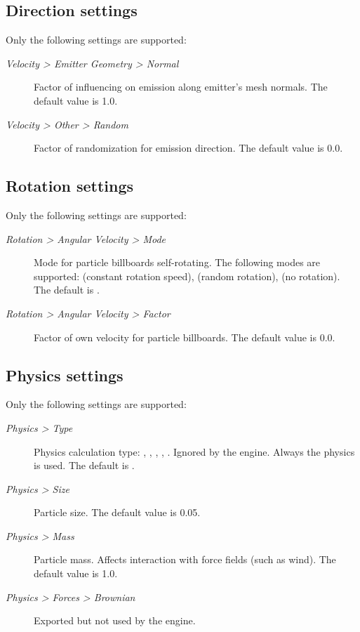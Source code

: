 \documentclass[a4paper,12pt,oneside]{sphinxmanual}
\begin{document}
\subsection{Direction settings}
\label{particles:id8}
Only the following settings are supported:
\begin{description}
\item[{\emph{Velocity \textgreater{} Emitter Geometry \textgreater{} Normal}}] \leavevmode
Factor of influencing on emission along emitter's mesh normals. The default value is 1.0.

\item[{\emph{Velocity \textgreater{} Other \textgreater{} Random}}] \leavevmode
Factor of randomization for emission direction. The default value is 0.0.

\end{description}


\subsection{Rotation settings}
\label{particles:id9}
Only the following settings are supported:
\begin{description}
\item[{\emph{Rotation \textgreater{} Angular Velocity \textgreater{} Mode}}] \leavevmode
Mode for particle billboards self-rotating. The following modes are supported:  (constant rotation speed),  (random rotation),  (no rotation). The default is .

\item[{\emph{Rotation \textgreater{} Angular Velocity \textgreater{} Factor}}] \leavevmode
Factor of own velocity for particle billboards. The default value is 0.0.

\end{description}


\subsection{Physics settings}
\label{particles:id10}
Only the following settings are supported:
\begin{description}
\item[{\emph{Physics \textgreater{} Type}}] \leavevmode
Physics calculation type: , , , , . Ignored by the engine. Always the  physics is used. The default is .

\item[{\emph{Physics \textgreater{} Size}}] \leavevmode
Particle size. The default value is 0.05.

\item[{\emph{Physics \textgreater{} Mass}}] \leavevmode
Particle mass. Affects interaction with force fields (such as wind). The default value is 1.0.

\item[{\emph{Physics \textgreater{} Forces \textgreater{} Brownian}}] \leavevmode
Exported but not used by the engine.

\end{description}
\end{document}
